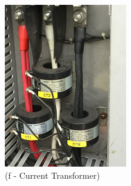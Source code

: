 \begin{figure}[!h]
\begin{minipage}[b]{0.22\linewidth}
		\includegraphics[width=\textwidth]{figures/fig_ch04_elecaudit_visualinspection_currenttransformer}
		\caption*{(f - Current Transformer)}
	\end{minipage}
	\hspace{0.03cm}
	\begin{minipage}[b]{0.22\linewidth}

\end{minipage}
\end{figure}
